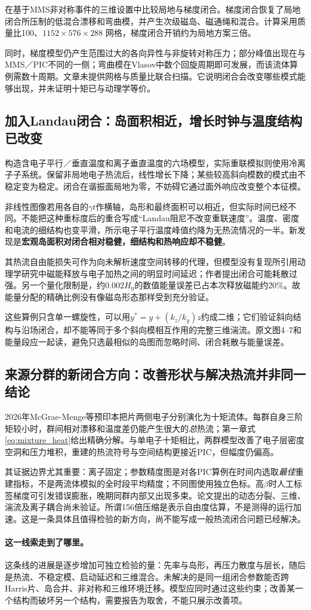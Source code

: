 \citet{Closure2026}在基于MMS非对称事件的三维设置中比较局地与梯度闭合。梯度闭合恢复了局地闭合所压制的低混合漂移和弯曲模，并产生次级磁岛、磁通绳和混合。计算采用质量比100、$1152\times576\times288$ 网格，梯度闭合开销约为局地方案三倍。

同时，梯度模型仍产生范围过大的各向异性与非旋转对称压力；部分峰值出现在与MMS／PIC不同的一侧；弯曲模在Vlasov中数个回旋周期即可发展，而该流体算例需数十周期。文章未提供网格与质量比联合扫描。它说明闭合会改变哪些模式能够出现，并未证明十矩已与动理学等价。

\subsection{加入Landau闭合：岛面积相近，增长时钟与温度结构已改变}
\citet{L244}构造含电子平行／垂直温度和离子垂直温度的六场模型，实际重联模拟则使用冷离子子系统。保留非局地电子热流后，线性增长下降；某些较高斜向模数的模式由不稳定变为稳定。闭合在谐振面局地为零，不妨碍它通过面外响应改变整个本征模。

非线性图像若用各自的$\gamma t$作横轴，岛形和最终面积可以相近，但实际时间已经不同。不能把这种重标度后的重合写成“Landau阻尼不改变重联速度”。温度、密度和电流的细结构也变平滑，所示电子平行温度峰值约降为无热流情况的一半。新发现是\textbf{宏观岛面积对闭合相对稳健，细结构和热响应却不稳健}。

其热流自由能损失可作为向未解析速度空间转移的代理，但模型没有复现所引用动理学研究中磁能释放与电子加热之间的明显时间延迟；作者提出闭合可能耗散过强。另一个量化限制是，约$0.002H_0$的数值能量误差已占本次释放磁能约20\%。故能量分配的精确比例没有像磁岛形态那样受到充分验证。

这些算例只含单一螺旋性，可以用$y^*=y+(k_z/k_y)z$约成二维；它们验证斜向结构与沿场闭合，却不能等同于多个斜向模相互作用的完整三维湍流。原文图4--7和能量段应一起读，避免只选最相似的岛图而忽略时间、闭合耗散与能量误差。

\subsection{来源分群的新闭合方向：改善形状与解决热流并非同一结论}
2026年McGrae-Menge等预印本把片两侧电子分别演化为十矩流体。每群自身三阶矩较小时，群间相对漂移和温度差仍能产生很大的\emph{总}热流；第一章式\eqref{eq:mixture_heat}给出精确分解。与单电子十矩相比，两群模型改善了电子层密度空洞和压力堆积，重建的热流符号与空间结构更接近PIC，但幅度仍偏高。\citep{F635}

其证据边界尤其重要：离子固定；参数精度图是对各PIC算例在时间内选取\emph{最佳}重建指标，不是两流体模拟的全时段平均精度；不同图使用独立色标。高$\beta$时人工标签梯度可引发错误膨胀，晚期同群内部又出现多束。论文提出的动态分裂、三维、湍流及离子耦合尚未验证。所谓156倍压缩是表示自由度估算，不是测得的运行加速。这是一条具体且值得检验的新方向，尚不能写成一般热流闭合问题已经解决。

\paragraph{这一线索走到了哪里。}这条线的进展是逐步增加可独立检验的量：先率与岛形，再压力散度与层长，随后是热流、不稳定模、启动延迟和三维混合。未解决的是同一组闭合参数能否跨Harris片、岛合并、非对称和三维环境迁移。模型应同时通过这些约束；改善某一个结构而破坏另一个结构，需要报告为取舍，不能只展示改善项。
